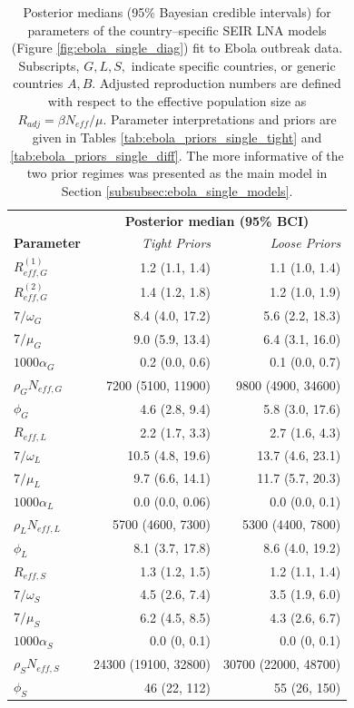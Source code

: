 \begin{table}[htbp]
	\caption[Posterior parameter estimates for country--specific SEIR LNA models fit Ebola outbreak data.]{Posterior medians (95\% Bayesian credible intervals) for parameters of the country--specific SEIR LNA models (Figure \ref{fig:ebola_single_diag}) fit to Ebola outbreak data. Subscripts, $ G,L,S, $ indicate specific countries, or generic countries $ A,B $. Adjusted reproduction numbers are defined with respect to the effective population size as $ R_{adj} = \beta N_{eff} /\mu $. Parameter interpretations and priors are given in Tables \ref{tab:ebola_priors_single_tight} and \ref{tab:ebola_priors_single_diff}. The more informative of the two prior regimes was presented as the main model in Section \ref{subsubsec:ebola_single_models}.}
	\label{tab:ebola_single_ests}
	\centering\footnotesize
	\begin{tabular}{lrr}
		\hline
		& \multicolumn{2}{c}{\textbf{Posterior median (95\% BCI)}}\\\cline{2-3}
		\textbf{Parameter} & \textit{Tight Priors} & \textit{Loose Priors} \\ 
		\hline
		$ R_{eff,G}^{(1)} $& 1.2 (1.1, 1.4) & 1.1 (1.0, 1.4) \\ 
		$ R_{eff,G}^{(2)} $& 1.4 (1.2, 1.8) & 1.2 (1.0, 1.9) \\ 
		$ 7/\omega_G $& 8.4 (4.0, 17.2) & 5.6 (2.2, 18.3) \\ 
		$ 7/\mu_G $& 9.0 (5.9, 13.4) & 6.4 (3.1, 16.0) \\ 
		$ 1000\alpha_{G} $& 0.2 (0.0, 0.6) & 0.1 (0.0, 0.7) \\ 
		$ \rho_GN_{eff,G} $& 7200 (5100, 11900) & 9800 (4900, 34600) \\ 
		$ \phi_{G} $& 4.6 (2.8, 9.4) & 5.8 (3.0, 17.6) \\ 
		\hline
		$ R_{eff,L} $& 2.2 (1.7, 3.3) & 2.7 (1.6, 4.3) \\ 
		$ 7/\omega_L $& 10.5 (4.8, 19.6) & 13.7 (4.6, 23.1) \\ 
		$ 7/\mu_L $& 9.7 (6.6, 14.1) & 11.7 (5.7, 20.3) \\ 
		$ 1000\alpha_L $& 0.0 (0.0, 0.06) & 0.0 (0.0, 0.1) \\ 
		$ \rho_LN_{eff,L} $& 5700 (4600, 7300) & 5300 (4400, 7800) \\ 
		$ \phi_L $& 8.1 (3.7, 17.8) & 8.6 (4.0, 19.2) \\ 
		\hline
		$ R_{eff,S} $& 1.3 (1.2, 1.5) & 1.2 (1.1, 1.4) \\ 
		$ 7/\omega_S $& 4.5 (2.6, 7.4) & 3.5 (1.9, 6.0) \\ 
		$ 7/\mu_S $& 6.2 (4.5, 8.5) & 4.3 (2.6, 6.7) \\ 
		$ 1000\alpha_S $& 0.0 (0, 0.1) & 0.0 (0, 0.1) \\ 
		$ \rho_SN_{eff,S} $& 24300 (19100, 32800) & 30700 (22000, 48700) \\ 
		$ \phi_S $& 46 (22, 112) & 55 (26, 150) \\ 
		\hline
	\end{tabular}
\end{table}

